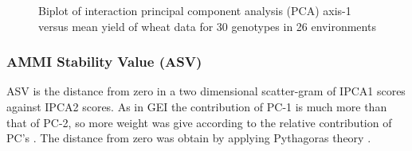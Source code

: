 \begin{figure} [h!]
	\caption[Biplot of IPCA axis-1 versus mean yield]{Biplot of interaction principal component analysis (PCA) axis-1 versus mean yield of wheat data for 30 genotypes in 26 environments  }
	\label{Figure:4.2 }
\end{figure}

\clearpage    
\subsubsection{AMMI Stability Value (ASV)}
ASV is the distance from zero in a two dimensional scatter-gram of IPCA1 scores against IPCA2 scores. As in GEI the contribution of PC-1 is much more than that of PC-2, so more weight was give according to the relative contribution of PC's \citep{Farshadfar2008}. The distance from zero was obtain by applying Pythagoras theory \citep{Purchase1997}.
